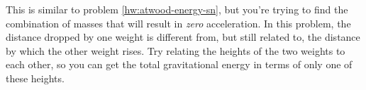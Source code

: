 This is similar to problem \ref{hw:atwood-energy-sn},
but you're trying to find the combination of masses that will result in \emph{zero}
acceleration. In this problem, the distance dropped
by one weight is different from, but still related to,
 the distance by which the other weight rises. Try relating the heights of the
 two weights to each other, so you can get the total gravitational energy in terms
 of only one of these heights.
